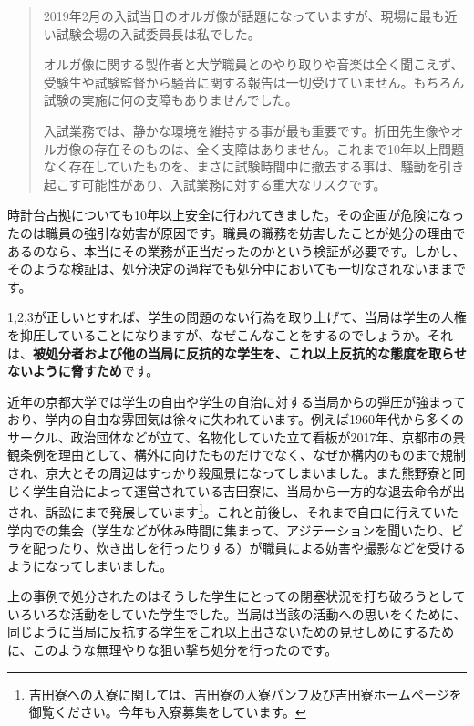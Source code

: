 \begin{quotation}
    2019年2月の入試当日のオルガ像が話題になっていますが、現場に最も近い試験会場の入試委員長は私でした。

    オルガ像に関する製作者と大学職員とのやり取りや音楽は全く聞こえず、受験生や試験監督から騒音に関する報告は一切受けていません。もちろん試験の実施に何の支障もありませんでした。

    入試業務では、静かな環境を維持する事が最も重要です。折田先生像やオルガ像の存在そのものは、全く支障はありません。これまで10年以上問題なく存在していたものを、まさに試験時間中に撤去する事は、騒動を引き起こす可能性があり、入試業務に対する重大なリスクです。
\end{quotation}

時計台占拠についても10年以上安全に行われてきました。その企画が危険になったのは職員の強引な妨害が原因です。職員の職務を妨害したことが処分の理由であるのなら、本当にその業務が正当だったのかという検証が必要です。しかし、そのような検証は、処分決定の過程でも処分中においても一切なされないままです。

\vspace{4mm}
\noindent{}

1,2,3が正しいとすれば、学生の問題のない行為を取り上げて、当局は学生の人権を抑圧していることになりますが、なぜこんなことをするのでしょうか。それは、\textbf{被処分者および他の当局に反抗的な学生を、これ以上反抗的な態度を取らせないように脅すため}です。

近年の京都大学では学生の自由や学生の自治に対する当局からの弾圧が強まっており、学内の自由な雰囲気は徐々に失われています。例えば1960年代から多くのサークル、政治団体などが立て、名物化していた立て看板が2017年、京都市の景観条例を理由として、構外に向けたものだけでなく、なぜか構内のものまで規制され、京大とその周辺はすっかり殺風景になってしまいました。また熊野寮と同じく学生自治によって運営されている吉田寮に、当局から一方的な退去命令が出され、訴訟にまで発展しています\footnote{吉田寮への入寮に関しては、吉田寮の入寮パンフ及び吉田寮ホームページを御覧ください。今年も入寮募集をしています。}。これと前後し、それまで自由に行えていた学内での集会（学生などが休み時間に集まって、アジテーションを聞いたり、ビラを配ったり、炊き出しを行ったりする）が職員による妨害や撮影などを受けるようになってしまいました。

上の事例で処分されたのはそうした学生にとっての閉塞状況を打ち破ろうとしていろいろな活動をしていた学生でした。当局は当該の活動への思いをくために、同じように当局に反抗する学生をこれ以上出さないための見せしめにするために、このような無理やりな狙い撃ち処分を行ったのです。

